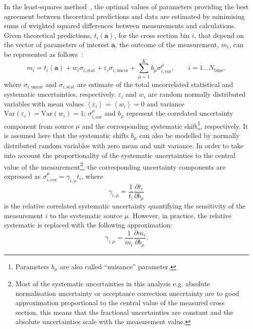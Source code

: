 In the least-squares method~\cite{Behnke:2013pga}, the optimal values of parameters providing the best agreement between theoretical predictions and data are estimated by minimising sums of weighted squared differences between measurements and calculations. Given theoretical predictions, $t_i\left( \mathbf{a} \right)$, for the cross section bin $i$, that depend on the vector of parameters of interest $\mathbf{a}$, the outcome of the measurement, $m_i$, can be represented as follows~\cite{Stump:2001gu,Botje:2001fx}:
\begin{equation}
 m_i = t_i\left( \mathbf{a} \right) + w_{i}\sigma_{i,\text{stat}} + \varepsilon_{i} \sigma_{i,\text{uncor}} + \sum_{\mu=1}^{K}{b_{\mu}\sigma_{i,\text{cor}}^\mu}, \qquad i=1\ldots N_\text{bins},
\label{eq:measmodel}
\end{equation}
where $\sigma_{i,\text{uncor}}$ and $\sigma_{i,\text{stat}}$ are estimate of the total uncorrelated statistical and systematic uncertainties, respectively. $\varepsilon_{i}$ and $w_{i}$ are random normally distributed variables with mean values $\left\langle \varepsilon_{i}\right\rangle = \left\langle w_{i} \right\rangle = 0$ and variance $\text{Var}\left( \varepsilon_{i}\right) = \text{Var}\left( w_{i}\right)  = 1$; $\sigma_{i,\text{cor}}^\mu$ and $b_{\mu}$ represent the correlated uncertainty component from source $\mu$ and the corresponding systematic shift\footnote{Parameters $b_\mu$ are also called ``nuisance'' parameter.}, respectively. It is assumed here that the systematic shifts $b_{\mu}$ can also be modelled by normally distributed random variables with zero mean and unit variance. In order to take into account the proportionality of the systematic uncertainties to the central value of the measurement\footnote{Most of the systematic uncertainties in this analysis e.g. absolute normalisation uncertainty or acceptance correction uncertainty are to good approximation proportional to the central value of the measured cross section, this means that the fractional uncertainties are constant and the absolute uncertainties scale with the measurement value.}, the corresponding uncertainty components are expressed as $\sigma_{i,\text{cor}}^\mu = \gamma_{i,\mu}t_i$, where 
\begin{equation}
\gamma_{i,\mu}=\frac{1}{{t_i}} \frac{\partial t_i}{\partial b_{\mu}}
\end{equation}
is the relative correlated systematic uncertainty quantifying the sensitivity of the measurement $i$ to the systematic source $\mu$. However, in practice, the relative systematic is replaced with the following approximation:
\begin{equation}
\gamma_{i,\mu}=\frac{1}{{m_i}} \frac{\partial m_i}{\partial b_{\mu}}.
\end{equation}


